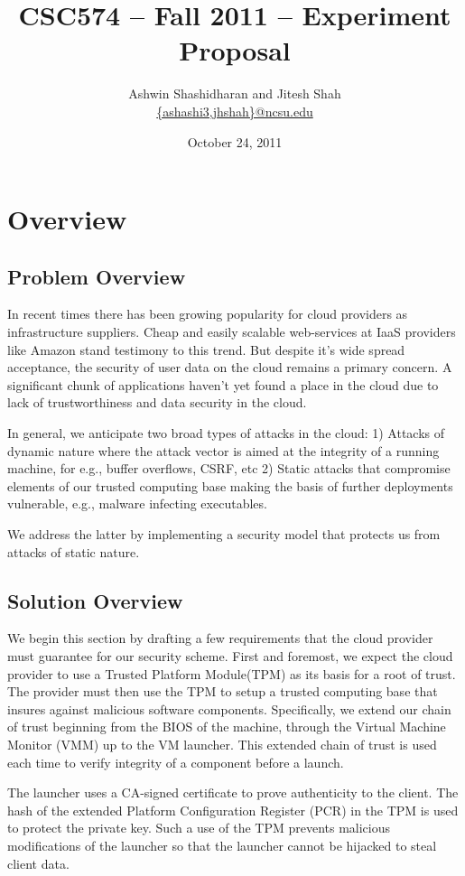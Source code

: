 \documentclass[11pt,pdftex]{article}
\title{CSC574 -- Fall 2011 -- Experiment Proposal}
\author{Ashwin Shashidharan and Jitesh Shah \\
\url{{ashashi3,jhshah}@ncsu.edu}
}
\date{October 24, 2011}
\begin{document}
\maketitle

\section{Overview}
\subsection{Problem Overview}
In recent times there has been growing popularity for cloud providers as infrastructure suppliers. Cheap and easily scalable web-services at IaaS providers like Amazon stand testimony to this trend. But despite it's wide spread acceptance, the security of user data on the cloud remains a primary concern. A significant chunk of applications haven't yet found a place in the cloud due to lack of trustworthiness and data security in the cloud.

In general, we anticipate two broad types of attacks in the cloud: 1) Attacks of dynamic nature where the attack vector is aimed at the integrity of a running machine, for e.g., buffer overflows, CSRF, etc 2) Static attacks that compromise elements of our trusted computing base making the basis of further deployments vulnerable, e.g., malware infecting executables.

We address the latter by implementing a security model that protects us from attacks of static nature.

\subsection{Solution Overview}
We begin this section by drafting a few requirements that the cloud provider must guarantee for our security scheme. 
First and foremost, we expect the cloud provider to use a Trusted Platform Module(TPM) as its basis for a root of trust. The provider must then use the TPM to setup a trusted computing base that insures against malicious software components. Specifically, we extend our chain of trust beginning from the BIOS of the machine, through the Virtual Machine Monitor (VMM) up to the VM launcher. This extended chain of trust is used each time to verify integrity of a component before a launch. 

The launcher uses a CA-signed certificate to prove authenticity to the client. The hash of the extended Platform Configuration Register (PCR) in the TPM is used to protect the private key. Such a use of the TPM prevents malicious modifications of the launcher so that the launcher cannot be hijacked to steal client data.
\end{document}

